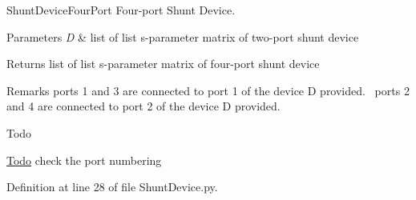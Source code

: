 Shunt\+Device\+Four\+Port Four-\/port Shunt Device. 


\begin{DoxyParams}{Parameters}
{\em D} & list of list s-\/parameter matrix of two-\/port shunt device \\
\hline
\end{DoxyParams}
\begin{DoxyReturn}{Returns}
list of list s-\/parameter matrix of four-\/port shunt device 
\end{DoxyReturn}
\begin{DoxyRemark}{Remarks}
ports 1 and 3 are connected to port 1 of the device D provided.~\newline
 ports 2 and 4 are connected to port 2 of the device D provided.~\newline

\end{DoxyRemark}
\begin{DoxyRefDesc}{Todo}
\item[\hyperlink{todo__todo000004}{Todo}]check the port numbering \end{DoxyRefDesc}


Definition at line 28 of file Shunt\+Device.\+py.

